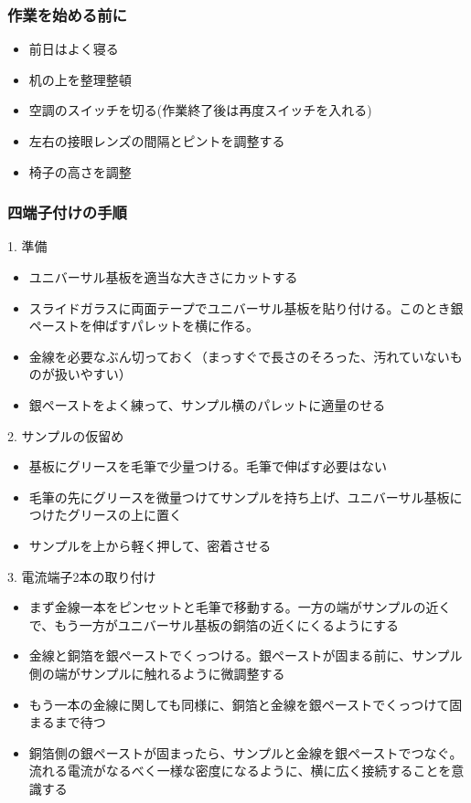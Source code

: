 \subsubsection{作業を始める前に} 
\begin{itemize}
\item 前日はよく寝る
\item 机の上を整理整頓
\item 空調のスイッチを切る(作業終了後は再度スイッチを入れる)
\item 左右の接眼レンズの間隔とピントを調整する
\item 椅子の高さを調整
\end{itemize}
 
\subsubsection{四端子付けの手順} 
1. 準備
\begin{itemize}
\item ユニバーサル基板を適当な大きさにカットする
\item スライドガラスに両面テープでユニバーサル基板を貼り付ける。このとき銀ペーストを伸ばすパレットを横に作る。
\item 金線を必要なぶん切っておく（まっすぐで長さのそろった、汚れていないものが扱いやすい）
\item 銀ペーストをよく練って、サンプル横のパレットに適量のせる
\end{itemize}
 
2. サンプルの仮留め
\begin{itemize}
\item 基板にグリースを毛筆で少量つける。毛筆で伸ばす必要はない
\item 毛筆の先にグリースを微量つけてサンプルを持ち上げ、ユニバーサル基板につけたグリースの上に置く
\item サンプルを上から軽く押して、密着させる
\end{itemize}
 
3. 電流端子2本の取り付け
\begin{itemize}
\item まず金線一本をピンセットと毛筆で移動する。一方の端がサンプルの近くで、もう一方がユニバーサル基板の銅箔の近くにくるようにする
\item 金線と銅箔を銀ペーストでくっつける。銀ペーストが固まる前に、サンプル側の端がサンプルに触れるように微調整する
\item もう一本の金線に関しても同様に、銅箔と金線を銀ペーストでくっつけて固まるまで待つ
\item 銅箔側の銀ペーストが固まったら、サンプルと金線を銀ペーストでつなぐ。流れる電流がなるべく一様な密度になるように、横に広く接続することを意識する
 \end{itemize}
 
